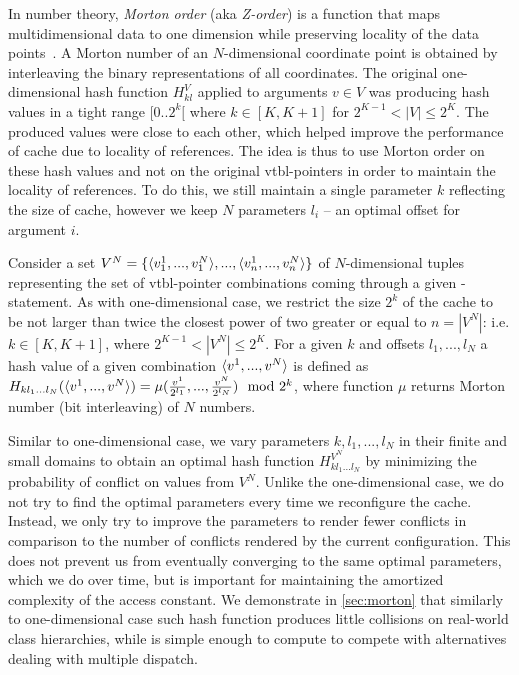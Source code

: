 In number theory, \emph{Morton order} (aka \emph{Z-order}) is a function that 
maps multidimensional data to one dimension while preserving locality of the 
data points~\cite{Morton66}. A Morton number of an $N$-dimensional coordinate 
point is obtained by interleaving the binary representations of all coordinates.
The original one-dimensional hash function $H_{kl}^V$ applied to arguments $v \in V$ 
was producing hash values in a tight range $[0..2^k[$ where $k \in [K,K+1]$ for 
$2^{K-1} < |V| \leq 2^K$. The produced values were close to each other, which 
helped improve the performance of cache due to locality of references. The 
idea is thus to use Morton order on these hash values and not on the original 
vtbl-pointers in order to maintain the locality of references. To do this, we 
still maintain a single parameter $k$ reflecting the size of cache, however we 
keep $N$ parameters $l_i$ -- an optimal offset for argument $i$.

Consider a set $V^N = \{\langle v_1^1,...,v_1^N\rangle,...,\langle v_n^1,...,v_n^N\rangle\}$ of 
$N$-dimensional tuples representing the set of vtbl-pointer combinations coming 
through a given -statement. As with one-dimensional case, we 
restrict the size $2^k$ of the cache to be not larger than twice the closest 
power of two greater or equal to $n=|V^N|$: i.e. $k \in [K,K+1]$, where 
$2^{K-1} < |V^N| \leq 2^K$. For a given $k$ and offsets $l_1,...,l_N$ a hash 
value of a given combination $\langle v^1,...,v^N\rangle$ is defined as 
$H_{kl_1...l_N}(\langle v^1,...,v^N\rangle)=\mu(\frac{v^1}{2^{l_1}},...,\frac{v^N}{2^{l_N}}) \mod 2^k$, 
where function $\mu$ returns Morton number (bit interleaving) of $N$ numbers.
 
Similar to one-dimensional case, we vary parameters $k,l_1,...,l_N$ in 
their finite and small domains to obtain an optimal hash function 
$H^{V^N}_{kl_1...l_N}$ by minimizing the probability of conflict on values from 
$V^N$. Unlike the one-dimensional case, we do not try to find the optimal 
parameters every time we reconfigure the cache. Instead, we only try to improve 
the parameters to render fewer conflicts in comparison to the number of conflicts 
rendered by the current configuration. This does not prevent us from eventually 
converging to the same optimal parameters, which we do over time, but is 
important for maintaining the amortized complexity of the access constant. 
We demonstrate in \textsection\ref{sec:morton} that similarly to one-dimensional 
case such hash function produces little collisions on real-world class 
hierarchies, while is simple enough to compute to compete with alternatives 
dealing with multiple dispatch.

